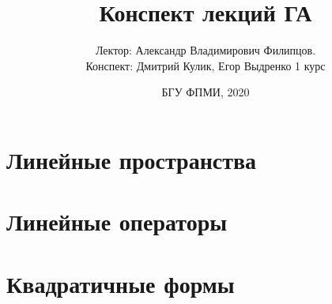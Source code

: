 \documentclass[12pt,a4paper,oneside]{report}
\title{Конспект лекций ГА}
\author{Лектор: Александр Владимирович Филипцов.\\Конспект: Дмитрий Кулик, Егор Выдренко 1 курс}
\date{БГУ ФПМИ, 2020}
\begin{document}
\maketitle
\tableofcontents
\chapter{Линейные пространства}

\chapter{Линейные операторы}




\chapter{Квадратичные формы}

\end{document}
